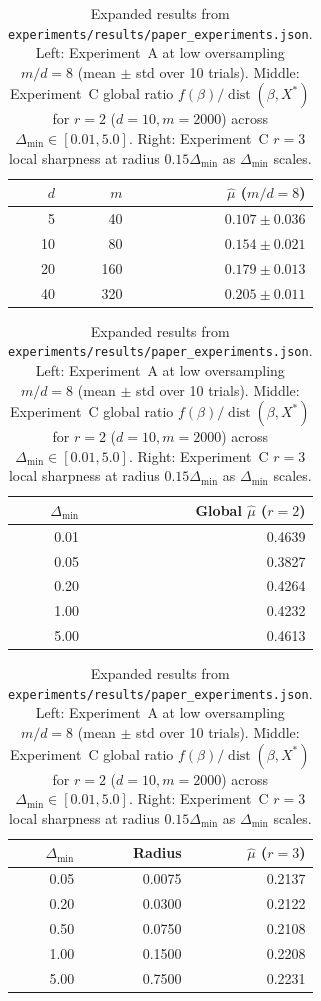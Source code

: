 \documentclass[11pt]{article}
\newcommand{\dist}{\operatorname{dist}}
\begin{document}
\begin{table}[htbp]
  \centering
  \footnotesize
  \caption{Expanded results from \texttt{experiments/results/paper\_experiments.json}. Left: Experiment~A at low oversampling $m/d = 8$ (mean $\pm$ std over 10 trials). Middle: Experiment~C global ratio $f(\beta)/\dist(\beta, X^*)$ for $r = 2$ ($d = 10, m = 2000$) across $\Delta_{\min} \in [0.01, 5.0]$. Right: Experiment~C $r = 3$ local sharpness at radius $0.15\Delta_{\min}$ as $\Delta_{\min}$ scales.}
  \label{tab:sm-exp-extra}
  \begin{tabular}{@{}rrr@{}}
    \toprule
    $d$ & $m$ & $\hat\mu$ ($m/d=8$) \\
    \midrule
     5 &  40 & $0.107 \pm 0.036$ \\
    10 &  80 & $0.154 \pm 0.021$ \\
    20 & 160 & $0.179 \pm 0.013$ \\
    40 & 320 & $0.205 \pm 0.011$ \\
    \bottomrule
  \end{tabular}
  \hspace{0.9em}
  \begin{tabular}{@{}rr@{}}
    \toprule
    $\Delta_{\min}$ & Global $\hat\mu$ ($r=2$) \\
    \midrule
    0.01 & 0.4639 \\
    0.05 & 0.3827 \\
    0.20 & 0.4264 \\
    1.00 & 0.4232 \\
    5.00 & 0.4613 \\
    \bottomrule
  \end{tabular}
  \hspace{0.9em}
  \begin{tabular}{@{}rrr@{}}
    \toprule
    $\Delta_{\min}$ & Radius & $\hat\mu$ ($r=3$) \\
    \midrule
    0.05 & 0.0075 & 0.2137 \\
    0.20 & 0.0300 & 0.2122 \\
    0.50 & 0.0750 & 0.2108 \\
    1.00 & 0.1500 & 0.2208 \\
    5.00 & 0.7500 & 0.2231 \\
    \bottomrule
  \end{tabular}
\end{table}
\end{document}
